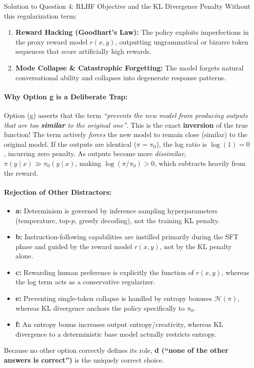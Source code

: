 \documentclass[11pt,a4paper]{article}
\begin{document}
\begin{solutionbox}{Solution to Question 4: RLHF Objective and the KL Divergence Penalty}
Without this regularization term:
\begin{enumerate}[noitemsep]
    \item \textbf{Reward Hacking (Goodhart's Law):} The policy exploits imperfections in the proxy reward model $r(x, y)$, outputting ungrammatical or bizarre token sequences that score artificially high rewards.
    \item \textbf{Mode Collapse \& Catastrophic Forgetting:} The model forgets natural conversational ability and collapses into degenerate response patterns.
\end{enumerate}

\paragraph{Why Option g is a Deliberate Trap:}
Option (g) asserts that the term \textit{``prevents the new model from producing outputs that are too \textbf{similar} to the original one''}. This is the exact \textbf{inversion} of the true function! The term actively \textit{forces} the new model to remain close (similar) to the original model. If the outputs are identical ($\pi = \pi_0$), the log ratio is $\log(1) = 0$, incurring zero penalty. As outputs become more \textit{dissimilar}, $\pi(y \mid x) \gg \pi_0(y \mid x)$, making $\log(\pi/\pi_0) > 0$, which subtracts heavily from the reward.

\paragraph{Rejection of Other Distractors:}
\begin{itemize}[leftmargin=1.5em,noitemsep]
    \item \textbf{a:} Determinism is governed by inference sampling hyperparameters (temperature, top-$p$, greedy decoding), not the training KL penalty.
    \item \textbf{b:} Instruction-following capabilities are instilled primarily during the SFT phase and guided by the reward model $r(x, y)$, not by the KL penalty alone.
    \item \textbf{c:} Rewarding human preference is explicitly the function of $r(x, y)$, whereas the log term acts as a conservative regularizer.
    \item \textbf{e:} Preventing single-token collapse is handled by entropy bonuses $\mathcal{H}(\pi)$, whereas KL divergence anchors the policy specifically to $\pi_0$.
    \item \textbf{f:} An entropy bonus increases output entropy/creativity, whereas KL divergence to a deterministic base model actually restricts entropy.
\end{itemize}
Because no other option correctly defines its role, \textbf{d (``none of the other answers is correct'')} is the uniquely correct choice.
\end{solutionbox}
\end{document}
